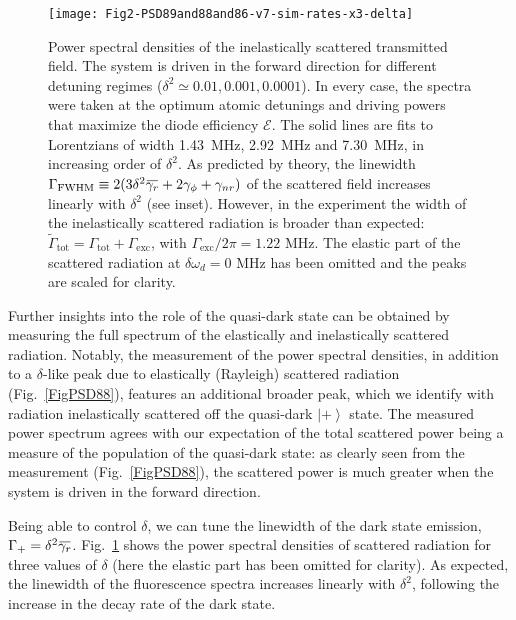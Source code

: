 \documentclass[pra, twocolumn, amsmath, amssymb, notitlepage, longbibliography, showpacs, superscriptaddress]{revtex4-1}
\newcommand{\ket}[1]{\ensuremath{\left|#1\r\rangle}}
\renewcommand{\r}[0]{\right}
\newcommand{\overbar}[1]{\mkern 1.5mu\overline{\mkern-1.5mu#1\mkern-1.5mu}\mkern 1.5mu}
\begin{document}
\begin{figure}[t!]
	\centering
	\texttt{[image: Fig2-PSD89and88and86-v7-sim-rates-x3-delta]}
	\caption{ Power spectral densities of the inelastically scattered transmitted field.
		The system is driven in the forward direction for different detuning regimes 
		($\delta^2 \simeq 0.01, 0.001, 0.0001$).
		In every case, the spectra were taken at the 
		optimum atomic detunings and driving powers that
		maximize the diode efficiency $\mathcal{E}$. 
		The solid lines are fits to Lorentzians 
		of width 1.43~MHz, 2.92~MHz and 7.30~MHz, in increasing order of $\delta^2$.
		As predicted by theory, the linewidth 
		$\Gamma_{\textrm{FWHM}}\equiv 2(3\delta^2\overbar{\gamma_{r}}+2\gamma_\phi+\gamma_{nr})$
		of the scattered field increases linearly with $\delta^2$ (see inset).  
		However, in the experiment the width of the inelastically 
		scattered radiation is broader than expected: 
		$\tilde\Gamma_\textrm{tot}=\Gamma_\textrm{tot}+\Gamma_\textrm{exc}$,
		with $\Gamma_\textrm{exc}/2\pi=1.22\textrm{ MHz}$.          
		The elastic part of the scattered radiation at $\delta\omega_d = 0\textrm{ MHz}$ 
		has been omitted and the peaks are scaled for clarity.}       
	\label{FigPSD88and86}
\end{figure}

Further insights into the role of the quasi-dark state 
can be obtained by measuring the full spectrum of the elastically and 
inelastically scattered radiation. Notably, the measurement 
of the power spectral densities, in addition to a $\delta$-like peak due 
to elastically (Rayleigh) scattered radiation (Fig.~\ref{FigPSD88}), 
features an additional broader peak, which we identify with radiation 
inelastically scattered off the quasi-dark $\ket{+}$ state. The measured power spectrum agrees with 
our expectation of the total scattered power being a measure of the 
population of the quasi-dark state: as clearly seen from the measurement (Fig.~\ref{FigPSD88}), the scattered 
power is much greater when the system is driven in the forward direction.

Being able to control $\delta$, we can tune the linewidth 
of the dark state emission, $\Gamma_+=\delta^2\overbar{\gamma_r}$. 
Fig.~\ref{FigPSD88and86} shows the power spectral densities 
of scattered radiation for three values of $\delta$ (here the elastic part has been omitted for clarity). 
As expected, the linewidth of the fluorescence spectra increases linearly with $\delta^2$,
 following the increase in the decay rate of the dark state.
\end{document}
